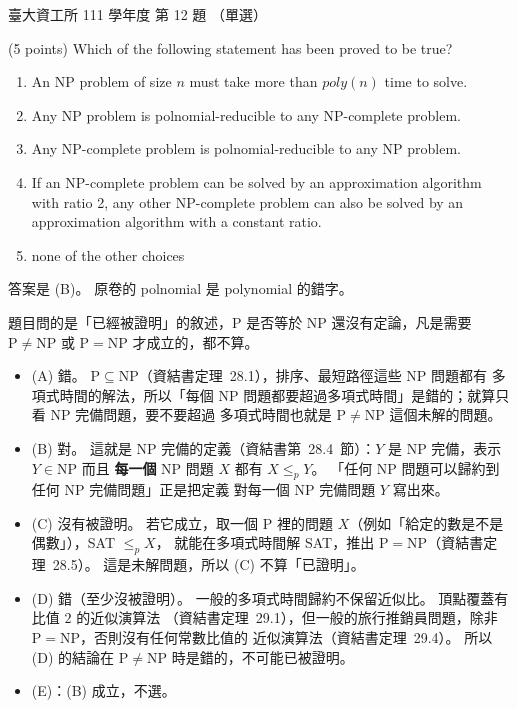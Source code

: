 \begin{pastexam}[label={px:ntu-111-dsaa-12}]{臺大資工所 111 學年度 第 12 題}
（單選）

(5 points) Which of the following statement has been proved to be true?
\begin{enumerate}[label=(\Alph*)]
\item An NP problem of size $n$ must take more than $poly(n)$ time to solve.
\item Any NP problem is polnomial-reducible to any NP-complete problem.
\item Any NP-complete problem is polnomial-reducible to any NP problem.
\item If an NP-complete problem can be solved by an approximation algorithm with ratio 2, any
other NP-complete problem can also be solved by an approximation algorithm with a constant ratio.
\item none of the other choices
\end{enumerate}
\end{pastexam}

\begin{pastsoln}
答案是 (B)。 原卷的 polnomial 是 polynomial 的錯字。

題目問的是「已經被證明」的敘述，P 是否等於 NP 還沒有定論，凡是需要 $\mathrm{P} \ne \mathrm{NP}$ 或
$\mathrm{P} = \mathrm{NP}$ 才成立的，都不算。
\begin{itemize}
\item (A) 錯。 $\mathrm{P} \subseteq \mathrm{NP}$（資結書定理~28.1），排序、最短路徑這些 NP 問題都有
多項式時間的解法，所以「每個 NP 問題都要超過多項式時間」是錯的；就算只看 NP 完備問題，要不要超過
多項式時間也就是 $\mathrm{P} \ne \mathrm{NP}$ 這個未解的問題。
\item (B) 對。 這就是 NP 完備的定義（資結書第~28.4~節）：$Y$ 是 NP 完備，表示 $Y \in \mathrm{NP}$ 而且
\textbf{每一個} NP 問題 $X$ 都有 $X \le_p Y$。 「任何 NP 問題可以歸約到任何 NP 完備問題」正是把定義
對每一個 NP 完備問題 $Y$ 寫出來。
\item (C) 沒有被證明。 若它成立，取一個 P 裡的問題 $X$（例如「給定的數是不是偶數」），SAT $\le_p X$，
就能在多項式時間解 SAT，推出 $\mathrm{P} = \mathrm{NP}$（資結書定理~28.5）。 這是未解問題，所以 (C)
不算「已證明」。
\item (D) 錯（至少沒被證明）。 一般的多項式時間歸約不保留近似比。 頂點覆蓋有比值 $2$ 的近似演算法
（資結書定理~29.1），但一般的旅行推銷員問題，除非 $\mathrm{P} = \mathrm{NP}$，否則沒有任何常數比值的
近似演算法（資結書定理~29.4）。 所以 (D) 的結論在 $\mathrm{P} \ne \mathrm{NP}$ 時是錯的，不可能已被證明。
\item (E)：(B) 成立，不選。
\end{itemize}
\end{pastsoln}

